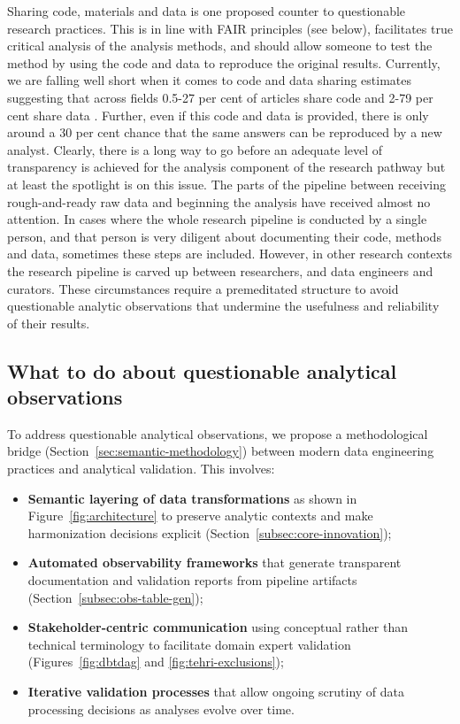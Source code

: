 \documentclass{article}
\begin{document}
Sharing code, materials and data is one proposed counter to questionable research practices. This is in line with FAIR principles (see below), facilitates true critical analysis of the analysis methods, and should allow someone to test the method by using the code and data to reproduce the original results. Currently, we are falling well short when it comes to code and data sharing estimates suggesting that across fields 0.5-27 per cent of articles share code and 2-79 per cent share data \cite{hardwicke2018data, culina2020low, stodden2018empirical, kambouris2024computationally, hamilton2023prevalence}. Further, even if this code and data is provided, there is only around a 30 per cent chance that the same answers can be reproduced by a new analyst\cite{hardwicke2018data, kambouris2024computationally}. Clearly, there is a long way to go before an adequate level of transparency is achieved for the analysis component of the research pathway but at least the spotlight is on this issue. The parts of the pipeline between receiving rough-and-ready raw data and beginning the analysis have received almost no attention. In cases where the whole research pipeline is conducted by a single person, and that person is very diligent about documenting their code, methods and data, sometimes these steps are included. However, in other research contexts the research pipeline is carved up between researchers, and data engineers and curators. These circumstances require a premeditated structure to avoid questionable analytic observations that undermine the usefulness and reliability of their results. 

\subsection{What to do about questionable analytical observations}

To address questionable analytical observations, we propose a methodological bridge (Section~\ref{sec:semantic-methodology}) between modern data engineering practices and analytical validation. This involves:
\begin{itemize}
    \item \textbf{Semantic layering of data transformations} as shown in Figure~\ref{fig:architecture} to preserve analytic contexts and make harmonization decisions explicit (Section~\ref{subsec:core-innovation});
    \item \textbf{Automated observability frameworks} that generate transparent documentation and validation reports from pipeline artifacts (Section~\ref{subsec:obs-table-gen});
    \item \textbf{Stakeholder-centric communication} using conceptual rather than technical terminology to facilitate domain expert validation (Figures~\ref{fig:dbtdag} and \ref{fig:tehri-exclusions});
    \item \textbf{Iterative validation processes} that allow ongoing scrutiny of data processing decisions as analyses evolve over time.
\end{itemize}
\end{document}
